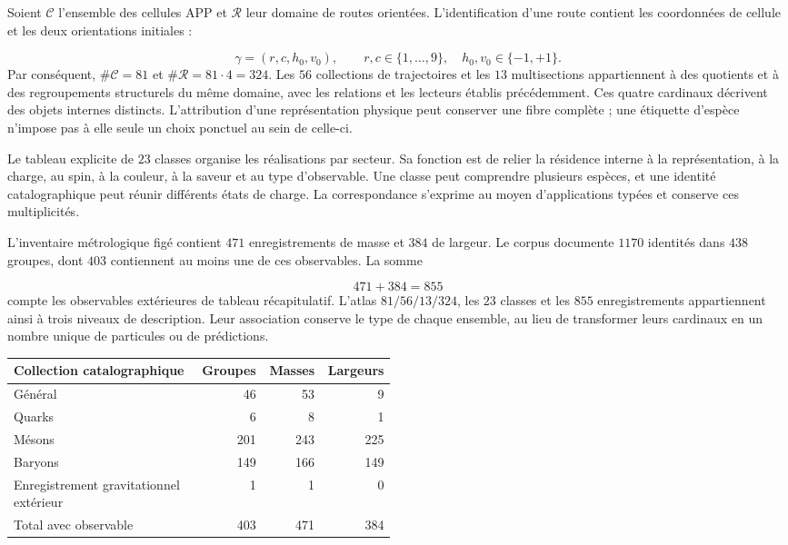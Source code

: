 Soient \(\mathcal C\) l’ensemble des cellules APP et \(\mathcal R\) leur domaine
de routes orientées. L’identification d’une route contient les coordonnées
de cellule et les deux orientations initiales :

\[
 \gamma=(r,c,h_0,v_0),\qquad
 r,c\in\{1,\ldots,9\},\quad h_0,v_0\in\{-1,+1\}.
\]
Par conséquent, \(\#\mathcal C=81\) et \(\#\mathcal R=81\cdot4=324\).
Les \(56\) collections de trajectoires et les \(13\) multisections appartiennent
à des quotients et à des regroupements structurels du même domaine, avec les
relations et les lecteurs établis précédemment. Ces quatre cardinaux
décrivent des objets internes distincts. L’attribution d’une représentation
physique peut conserver une fibre complète ; une étiquette d’espèce
n’impose pas à elle seule un choix ponctuel au sein de celle-ci.


Le tableau explicite de \(23\) classes organise les réalisations par secteur.
Sa fonction est de relier la résidence interne à la représentation, à la
charge, au spin, à la couleur, à la saveur et au type d’observable. Une classe peut
comprendre plusieurs espèces, et une identité catalographique peut réunir
différents états de charge. La correspondance s’exprime au moyen d’applications
typées et conserve ces multiplicités.


L’inventaire métrologique figé contient \(471\) enregistrements de masse et
\(384\) de largeur. Le corpus documente \(1170\) identités dans \(438\)
groupes, dont \(403\) contiennent au moins une de ces observables.
La somme

\[
 471+384=855
\]
compte les observables extérieures de tableau récapitulatif. L’atlas \(81/56/13/324\),
les \(23\) classes et les \(855\) enregistrements appartiennent ainsi à trois niveaux
de description. Leur association conserve le type de chaque ensemble, au lieu
de transformer leurs cardinaux en un nombre unique de particules ou de prédictions.


\begin{center}
\begin{tabular}{p{0.49\linewidth}rrr}
\toprule
Collection catalographique
 & Groupes
 & Masses
 & Largeurs
\\
\midrule
Général
 & 46 & 53 & 9\\
Quarks
 & 6 & 8 & 1\\
Mésons
 & 201 & 243 & 225\\
Baryons
 & 149 & 166 & 149\\
Enregistrement gravitationnel extérieur
 & 1 & 1 & 0\\
\midrule
Total avec observable
 & 403 & 471 & 384\\
\bottomrule
\end{tabular}
\end{center}

